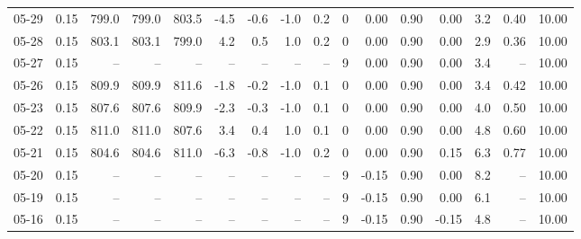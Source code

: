 \begin{threeparttable}
{\begin{tabular}{lrrrrrrrrrrrrrrr}
  05-29 &     0.15 & 799.0 & 799.0 & 803.5 &       -4.5 &           -0.6 &                     -1.0 &                 0.2 &              0 &       0.00 &      0.90 &           0.00 &              3.2 &            0.40 &                  10.00 \\
  05-28 &     0.15 & 803.1 & 803.1 & 799.0 &        4.2 &            0.5 &                      1.0 &                 0.2 &              0 &       0.00 &      0.90 &           0.00 &              2.9 &            0.36 &                  10.00 \\
  05-27 &     0.15 &    -- &    -- &    -- &         -- &             -- &                       -- &                  -- &              9 &       0.00 &      0.90 &           0.00 &              3.4 &              -- &                  10.00 \\
  05-26 &     0.15 & 809.9 & 809.9 & 811.6 &       -1.8 &           -0.2 &                     -1.0 &                 0.1 &              0 &       0.00 &      0.90 &           0.00 &              3.4 &            0.42 &                  10.00 \\
  05-23 &     0.15 & 807.6 & 807.6 & 809.9 &       -2.3 &           -0.3 &                     -1.0 &                 0.1 &              0 &       0.00 &      0.90 &           0.00 &              4.0 &            0.50 &                  10.00 \\
  05-22 &     0.15 & 811.0 & 811.0 & 807.6 &        3.4 &            0.4 &                      1.0 &                 0.1 &              0 &       0.00 &      0.90 &           0.00 &              4.8 &            0.60 &                  10.00 \\
  05-21 &     0.15 & 804.6 & 804.6 & 811.0 &       -6.3 &           -0.8 &                     -1.0 &                 0.2 &              0 &       0.00 &      0.90 &           0.15 &              6.3 &            0.77 &                  10.00 \\
  05-20 &     0.15 &    -- &    -- &    -- &         -- &             -- &                       -- &                  -- &              9 &      -0.15 &      0.90 &           0.00 &              8.2 &              -- &                  10.00 \\
  05-19 &     0.15 &    -- &    -- &    -- &         -- &             -- &                       -- &                  -- &              9 &      -0.15 &      0.90 &           0.00 &              6.1 &              -- &                  10.00 \\
  05-16 &     0.15 &    -- &    -- &    -- &         -- &             -- &                       -- &                  -- &              9 &      -0.15 &      0.90 &          -0.15 &              4.8 &              -- &                  10.00 \\

\end{tabular}}
\end{threeparttable}

